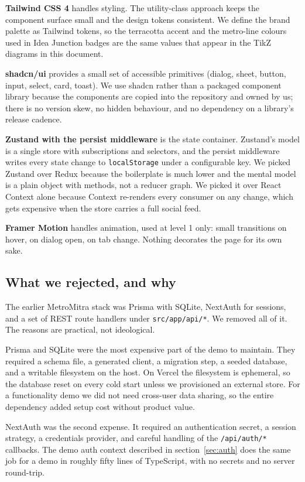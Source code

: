 \documentclass[a4paper,11pt]{article}
\begin{document}
\textbf{Tailwind CSS 4} handles styling. The utility-class approach keeps the
component surface small and the design tokens consistent. We define the brand
palette as Tailwind tokens, so the terracotta accent and the metro-line
colours used in Idea Junction badges are the same values that appear in the
TikZ diagrams in this document.

\textbf{shadcn/ui} provides a small set of accessible primitives (dialog,
sheet, button, input, select, card, toast). We use shadcn rather than a
packaged component library because the components are copied into the
repository and owned by us; there is no version skew, no hidden behaviour, and
no dependency on a library's release cadence.

\textbf{Zustand with the persist middleware} is the state container. Zustand's
model is a single store with subscriptions and selectors, and the persist
middleware writes every state change to \texttt{localStorage} under a
configurable key. We picked Zustand over Redux because the boilerplate is much
lower and the mental model is a plain object with methods, not a reducer
graph. We picked it over React Context alone because Context re-renders every
consumer on any change, which gets expensive when the store carries a full
social feed.

\textbf{Framer Motion} handles animation, used at level 1 only: small
transitions on hover, on dialog open, on tab change. Nothing decorates the
page for its own sake.

\subsection{What we rejected, and why}

The earlier MetroMitra stack was Prisma with SQLite, NextAuth for sessions,
and a set of REST route handlers under \texttt{src/app/api/*}. We removed all
of it. The reasons are practical, not ideological.

Prisma and SQLite were the most expensive part of the demo to maintain. They
required a schema file, a generated client, a migration step, a seeded
database, and a writable filesystem on the host. On Vercel the filesystem is
ephemeral, so the database reset on every cold start unless we provisioned an
external store. For a functionality demo we did not need cross-user data
sharing, so the entire dependency added setup cost without product value.

NextAuth was the second expense. It required an authentication secret, a
session strategy, a credentials provider, and careful handling of the
\texttt{/api/auth/*} callbacks. The demo auth context described in
section~\ref{sec:auth} does the same job for a demo in roughly fifty lines of
TypeScript, with no secrets and no server round-trip.
\end{document}
